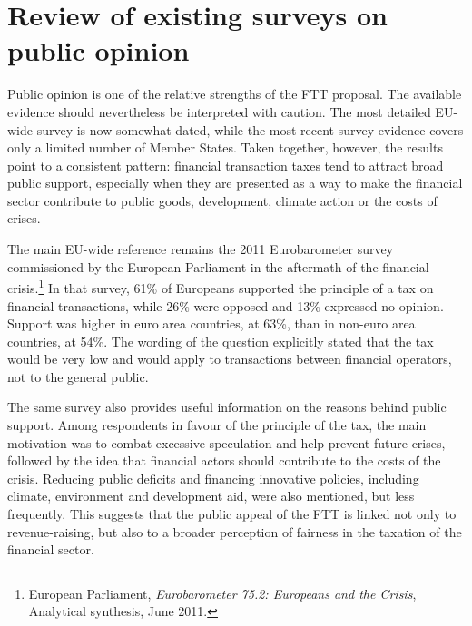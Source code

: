 \documentclass[../../main]{subfiles}
\begin{document}

\section{Review of existing surveys on public opinion}

Public opinion is one of the relative strengths of the FTT proposal. The available evidence should nevertheless be interpreted with caution. The most detailed EU-wide survey is now somewhat dated, while the most recent survey evidence covers only a limited number of Member States. Taken together, however, the results point to a consistent pattern: financial transaction taxes tend to attract broad public support, especially when they are presented as a way to make the financial sector contribute to public goods, development, climate action or the costs of crises.

The main EU-wide reference remains the 2011 Eurobarometer survey commissioned by the European Parliament in the aftermath of the financial crisis.\footnote{European Parliament, \textit{Eurobarometer 75.2: Europeans and the Crisis}, Analytical synthesis, June 2011.} In that survey, 61\% of Europeans supported the principle of a tax on financial transactions, while 26\% were opposed and 13\% expressed no opinion. Support was higher in euro area countries, at 63\%, than in non-euro area countries, at 54\%. The wording of the question explicitly stated that the tax would be very low and would apply to transactions between financial operators, not to the general public.

The same survey also provides useful information on the reasons behind public support. Among respondents in favour of the principle of the tax, the main motivation was to combat excessive speculation and help prevent future crises, followed by the idea that financial actors should contribute to the costs of the crisis. Reducing public deficits and financing innovative policies, including climate, environment and development aid, were also mentioned, but less frequently. This suggests that the public appeal of the FTT is linked not only to revenue-raising, but also to a broader perception of fairness in the taxation of the financial sector.
\end{document}

